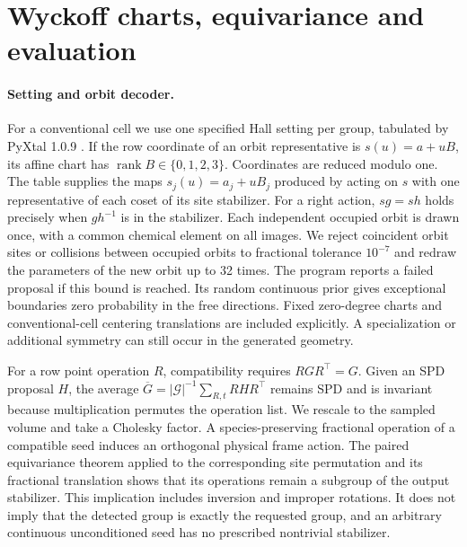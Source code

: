 \section{Wyckoff charts, equivariance and evaluation}\label{app:wyckoff}
\paragraph{Setting and orbit decoder.}
For a conventional cell we use one specified Hall setting per group, tabulated by PyXtal 1.0.9 \cite{pyxtal}. If the row coordinate of an orbit representative is $s(u)=a+uB$, its affine chart has $\operatorname{rank}B\in\{0,1,2,3\}$. Coordinates are reduced modulo one. The table supplies the maps $s_j(u)=a_j+u B_j$ produced by acting on $s$ with one representative of each coset of its site stabilizer. For a right action, $sg=sh$ holds precisely when $gh^{-1}$ is in the stabilizer. Each independent occupied orbit is drawn once, with a common chemical element on all images. We reject coincident orbit sites or collisions between occupied orbits to fractional tolerance $10^{-7}$ and redraw the parameters of the new orbit up to 32 times. The program reports a failed proposal if this bound is reached. Its random continuous prior gives exceptional boundaries zero probability in the free directions. Fixed zero-degree charts and conventional-cell centering translations are included explicitly. A specialization or additional symmetry can still occur in the generated geometry.

For a row point operation $R$, compatibility requires $RGR^\top=G$. Given an SPD proposal $H$, the average $\overline G=|\mathcal G|^{-1}\sum_{R,t}RHR^\top$ remains SPD and is invariant because multiplication permutes the operation list. We rescale to the sampled volume and take a Cholesky factor. A species-preserving fractional operation of a compatible seed induces an orthogonal physical frame action. The paired equivariance theorem applied to the corresponding site permutation and its fractional translation shows that its operations remain a subgroup of the output stabilizer. This implication includes inversion and improper rotations. It does not imply that the detected group is exactly the requested group, and an arbitrary continuous unconditioned seed has no prescribed nontrivial stabilizer.

